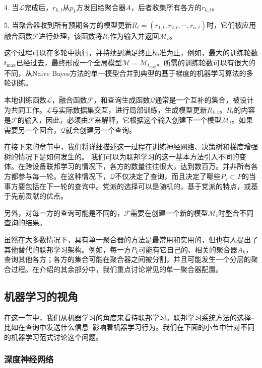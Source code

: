 4. 当$\mathcal{L}$完成后，$r_{k,t}$从$p_{k}$方发回给聚合器$A$，后者收集所有各方的$r_{k,t}$。

5. 当聚合器收到所有预期各方的模型更新$R_{t} = (r_{1,t}, r_{2,t}, \cdots , r_{n,t})$时，它们被应用融合函数$\mathcal{F}$进行处理，该函数将$R_{t}$作为输入并返回$\mathcal{M}_{t}$。

这个过程可以在多轮中执行，并持续到满足终止标准为止，例如，最大的训练轮数$t_{\max}$已经过去，最终形成一个全局模型$\mathcal{M} = \mathcal{M}_{t_{\max}}$。所需的训练轮数可以有很大的不同，从Naive Bayes方法的单一模型合并到典型的基于梯度的机器学习算法的多轮训练。

本地训练函数$\mathcal{L}$，融合函数$\mathcal{F}$，和查询生成函数$\mathcal{Q}$通常是一个互补的集合，被设计为共同工作。$\mathcal{L}$与实际数据集交互，进行局部训练，生成模型更新$R_{k,t}$。$R_{t}$的内容是$\mathcal{F}$的输入，因此，必须由$\mathcal{F}$来解释，它根据这个输入创建下一个模型$\mathcal{M}_{t}$。如果需要另一个回合，$\mathcal{Q}$就会创建另一个查询。

在接下来的章节中，我们将详细描述这一过程在训练神经网络、决策树和梯度增强树的情况下是如何发生的。
%
我们可以为联邦学习的这一基本方法引入不同的变体。在跨设备联邦学习的情况下，各方的数量往往很大，达到数百万。并非所有各方都参与每一轮。在这种情况下，$\mathcal{Q}$不仅决定了查询，而且决定了哪些$P_{s} \subset P$的当事方要包括在下一轮的查询中。党派的选择可以是随机的，基于党派的特点，或基于先前贡献的优点。

另外，对每一方的查询可能是不同的，$\mathcal{F}$需要在创建一个新的模型$\mathcal{M}_{t}$时整合不同查询的结果。

虽然在大多数情况下，具有单一聚合器的方法是最常用和实用的，但也有人提出了其他替代的联邦学习架构。例如，每一方$P_{k}$可能有它自己的、相关的聚合器$A_{k}$，查询其他各方；各方的集合可能在聚合器之间被分割，并且可能发生一个分层的聚合过程。在介绍的其余部分中，我们重点讨论常见的单一聚合器配置。

\subsection{机器学习的视角}

在这一节中，我们从机器学习的角度来看待联邦学习。联邦学习系统方法的选择--比如在查询中发送什么信息--影响着机器学习行为。我们在下面的小节中针对不同的机器学习范式讨论这个问题。

\subsubsection{深度神经网络}

